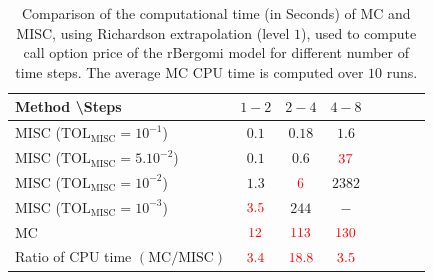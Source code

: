 \begin{table}[h!]
	\centering
	\begin{tabular}{l*{6}{c}r}
		Method \textbackslash  Steps            & $1-2$ & $2-4$ & $4-8$   \\
		\hline
		MISC ($\text{TOL}_{\text{MISC}}=10^{-1}$)  & $0.1$ & $0.18$ & $1.6$  \\
		MISC ($\text{TOL}_{\text{MISC}}=5.10^{-2}$)  & $0.1$ & $0.6$ & ${\color{red}37}$  \\
		MISC ($\text{TOL}_{\text{MISC}}=10^{-2}$)  & $1.3$ & ${\color{red}6}$ & $2382$  \\
		MISC ($\text{TOL}_{\text{MISC}}=10^{-3}$)  & ${\color{red}3.5}$ & $ 244$ & $-$   \\
		
		\hline	
		MC  &${\color{red}12}$ & ${\color{red}113}$  & ${\color{red}130}$   \\
		
		\hline	
		Ratio of CPU time $\left(\text{MC}/ \text{MISC} \right)$  &${\color{red} 3.4
		}$ & ${\color{red}     18.8
		}$  & ${\color{red} 3.5}
		$  \\
		\hline
		\end{tabular}
		\caption{Comparison of the computational time (in Seconds) of  MC and MISC, using Richardson extrapolation (level $1$), used to compute call option price of the rBergomi model for different number of time steps. The
			average MC CPU time is computed over $10$ runs.}
		\label{Comparsion of the computational time of  MC and MISC, using Richardson extrapolation (level $1$), used to compute Call option price of rBergomi model for different number of time steps. Case set $2$ parameters,linear}
		\end{table}
		
		\FloatBarrier
		
